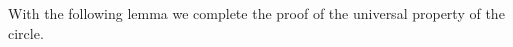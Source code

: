 \begin{comment}
Consider $f,g:\sphere{1}\to X$ with a homotopy $H:f\htpy g$. Then we have $H(\base):f(\base)=g(\base)$, and the square
\begin{equation*}
\begin{tikzcd}[column sep=large]
f(\base) \arrow[r,equals,"H(\base)"] \arrow[d,swap,equals,"\ap{f}{\lloop}"] & g(\base) \arrow[d,equals,"\ap{g}{\lloop}"] \\
f(\base) \arrow[r,equals,swap,"H(\base)"] & g(\base)
\end{tikzcd}
\end{equation*}
commutes by the naturality of homotopies, established in \cref{defn:htpy_nat}\index{naturality!of homotopies}. In the following lemma we will relate such squares in two ways to a transport, by generalizing the above situation sufficiently so that path induction becomes applicable. We will use these computations of transports to establish the universal property of the circle. 
\end{comment}

With the following lemma we complete the proof of the universal property of the circle. 

